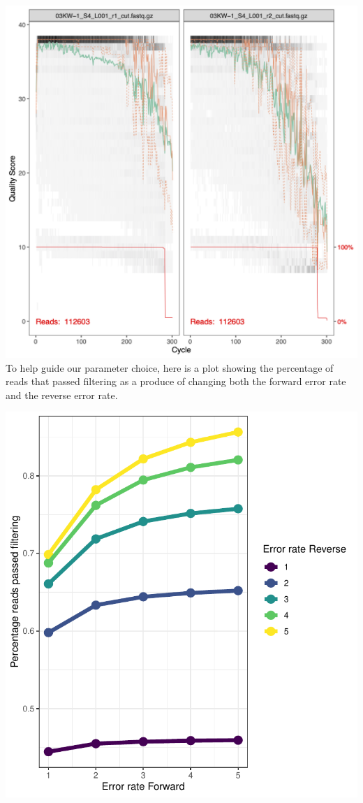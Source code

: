 \documentclass[
]{book}
\begin{document}
\includegraphics{book/project_files/quality_03KW-1.png}
To help guide our parameter choice, here is a plot showing the percentage of reads that passed filtering as a produce of changing both the forward error rate and the reverse error rate.

\includegraphics[width=10.93in]{book/project_files/filt_params}
\end{document}
